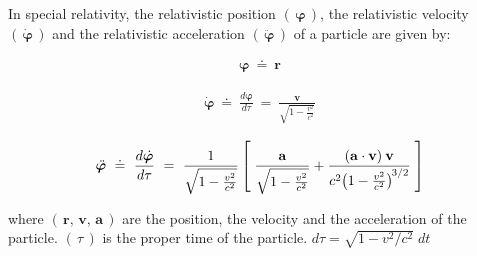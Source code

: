 \documentclass[10pt,fleqn]{article}
\begin{document}
\noindent In special relativity, the relativistic position $( \, {\boldsymbol{\varphi}} \, )$, the relativistic velocity $( \, \dot{\boldsymbol{\varphi}} \, )$ and the relativistic acceleration $( \, \ddot{\boldsymbol{\varphi}} \, )$ of a particle are given by:
\par \vspace{-0.30em}
\begin{eqnarray*}
{\boldsymbol{\varphi}} ~\doteq~ \mathbf{r}
\end{eqnarray*}
\par \vspace{+0.30em}
\begin{eqnarray*}
\dot{\boldsymbol{\varphi}} ~\doteq~ \frac{d{\boldsymbol{\varphi}}}{d{\tau}} ~=~ \frac{\mathbf{v}}{\sqrt{1 - \frac{v^2}{c^2}}}
\end{eqnarray*}
\par \vspace{-0.30em}
\begin{eqnarray*}
\ddot{\boldsymbol{\varphi}} ~\doteq~ \frac{d{\dot{\boldsymbol{\varphi}}}}{d{\tau}} ~=~ \frac{1}{\sqrt{1 - \frac{v^2}{c^2}}} \left [ \; \frac{\mathbf{a}}{\sqrt{1 - \frac{v^2}{c^2}}} + \frac{(\mathbf{a} \cdot \mathbf{v}) \: \mathbf{v}}{c^2\hspace{-0.18em}\left(1 - \frac{v^2}{c^2}\right)^{\hspace{-0.09em}{3/2}}} \; \right ]
\end{eqnarray*}
\par \vspace{+1.20em}
\noindent where $( \, \mathbf{r}, \, \mathbf{v}, \, \mathbf{a} \, )$ are the position, the velocity and the acceleration of the particle. $( \, {\tau} \, )$ is the proper time of the particle. {\small $d{\tau} = \sqrt{1 - v^2/c^2} \; d{t}$}

\newpage

\par {}

\bigskip \smallskip
\end{document}

